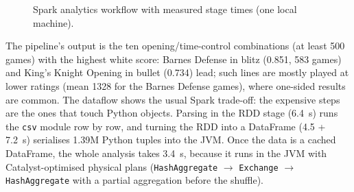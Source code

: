 \documentclass[11pt,a4paper]{article}
\begin{document}
\begin{figure}[H]\centering
{}
\caption{Spark analytics workflow with measured stage times (one local machine).}\label{fig:wf}
\end{figure}

The pipeline's output is the ten opening/time-control combinations (at least 500 games)
with the highest white score: Barnes Defense in blitz (0.851, 583 games) and
King's Knight Opening in bullet (0.734) lead; such lines are mostly played at lower
ratings (mean 1328 for the Barnes Defense games), where one-sided results are common. The dataflow shows the usual Spark trade-off:
the expensive steps are the ones that touch Python objects. Parsing in the RDD stage
(6.4~s) runs the \texttt{csv} module row by row, and turning the RDD into a DataFrame
(4.5 + 7.2~s) serialises 1.39M Python tuples into the JVM. Once the data is a cached
DataFrame, the whole analysis takes 3.4~s, because it runs in the JVM with
Catalyst-optimised physical plans (\texttt{HashAggregate} $\rightarrow$ \texttt{Exchange}
$\rightarrow$ \texttt{HashAggregate} with a partial aggregation before the shuffle).
\end{document}
